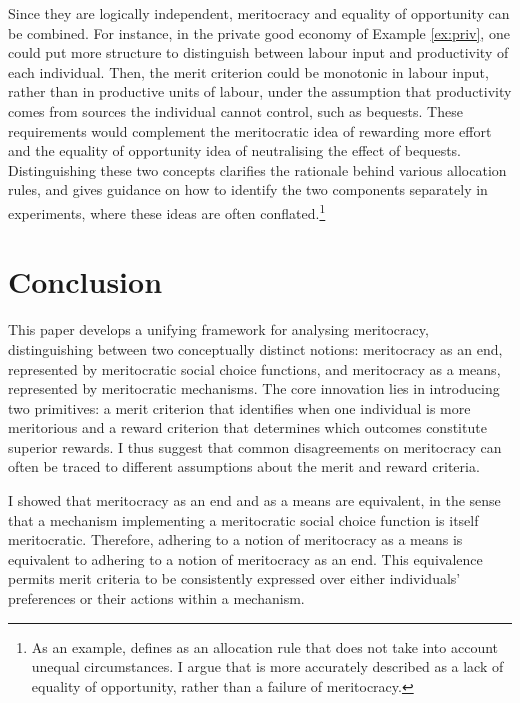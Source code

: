 Since they are logically independent, meritocracy and equality of opportunity can be combined. For instance, in the private good economy of Example \ref{ex:priv}, one could put more structure to distinguish between labour input and productivity of each individual. Then, the merit criterion could be monotonic in labour input, rather than in productive units of labour, under the assumption that productivity comes from sources the individual cannot control, such as bequests. These requirements would complement the meritocratic idea of rewarding more effort and the equality of opportunity idea of neutralising the effect of bequests. Distinguishing these two concepts clarifies the rationale behind various allocation rules, and gives guidance on how to identify the two components separately in experiments, where these ideas are often conflated.\footnote{As an example, \cite{andreShallowMeritocracy2024} defines  as an allocation rule that does not take into account unequal circumstances. I argue that  is more accurately described as a lack of equality of opportunity, rather than a failure of meritocracy.}

\section{Conclusion}\label{sec:conclusionmerit}

This paper develops a unifying framework for analysing meritocracy, distinguishing between two conceptually distinct notions: meritocracy as an end, represented by meritocratic social choice functions, and meritocracy as a means, represented by meritocratic mechanisms. The core innovation lies in introducing two primitives: a merit criterion that identifies when one individual is more meritorious and a reward criterion that determines which outcomes constitute superior rewards. I thus suggest that common disagreements on meritocracy can often be traced to different assumptions about the merit and reward criteria.

I showed that meritocracy as an end and as a means are equivalent, in the sense that a mechanism implementing a meritocratic social choice function is itself meritocratic. Therefore, adhering to a notion of meritocracy as a means is equivalent to adhering to a notion of meritocracy as an end. This equivalence permits merit criteria to be consistently expressed over either individuals’ preferences or their actions within a mechanism.

